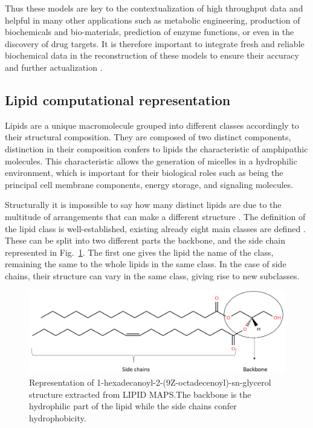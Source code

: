 \documentclass{llncs}
\begin{document}
Thus these models are key to the contextualization of high throughput data and helpful in many other applications such as metabolic engineering, production of biochemicals and bio-materials, prediction of enzyme functions, or even in the discovery of drug targets\cite{Gu2019,Kim2017}.
It is therefore important to integrate fresh and reliable biochemical data in the reconstruction of these models to ensure their accuracy and further actualization \cite{Moseley2021,Passi2021}. 


\subsection{Lipid computational representation}
Lipids are a unique macromolecule grouped into different classes accordingly to their structural composition. They are composed of two distinct components, distinction in their composition confers to lipids the characteristic of amphipathic molecules. 
This characteristic allows the generation of micelles in a hydrophilic environment, which is important for their biological roles such as being the principal cell membrane components, energy storage, and signaling molecules.

Structurally it is impossible to say how many distinct lipids are due to the multitude of arrangements that can make a different structure \cite{Gyamfi2018}. 
The definition of the lipid class is well-established, existing already eight main classes are defined \cite{Fahy2011}.
These can be split into two different parts the backbone, and the side chain represented in Fig.~\ref{fig1}. The first one gives the lipid the name of the class, remaining the same to the whole lipids in the same class.
In the case of side chains, their structure can vary in the same class, giving rise to new subclasses.

\begin{figure}
    \includegraphics[width=\textwidth]{imagens/lipido.png}
    \caption{Representation of 1-hexadecanoyl-2-(9Z-octadecenoyl)-sn-glycerol structure extracted from LIPID MAPS.The backbone is the hydrophilic part of the lipid while the side chains confer hydrophobicity.} \label{fig1}
\end{figure}
\end{document}
